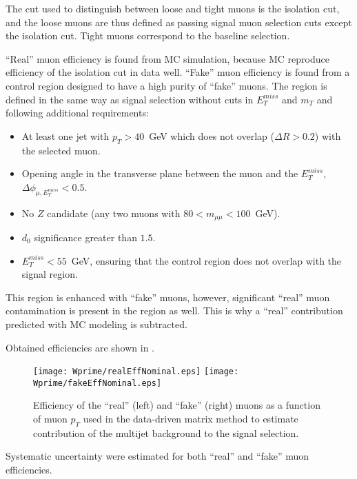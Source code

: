 The cut used to distinguish between loose and tight muons is the isolation cut, and the loose muons
are thus defined as passing signal muon selection cuts except the isolation cut. Tight muons correspond
to the baseline selection.

``Real'' muon efficiency is found from MC simulation, because MC reproduce efficiency of the isolation cut in data well. ``Fake'' muon efficiency is found from a control region designed to have a high purity of ``fake'' muons. The region is defined in the same way as signal selection without cuts in $E_T^{miss}$ and $m_T$ and following additional requirements:
\begin{itemize}
\item At least one jet with $p_T > 40$~GeV which does not overlap ($\Delta R > 0.2$)
with the selected muon.
\item Opening angle in the transverse plane between the muon and the $E_T^{miss}$, $\Delta\phi_{\mu,E_T^{miss}} < 0.5$.
\item No $Z$ candidate (any two muons with $80 < m_{\mu\mu} < 100$~GeV).
\item $d_0$ significance greater than $1.5$.
\item $E_T^{miss} < 55$~GeV, ensuring that the control region does not overlap with the signal region.
\end{itemize}
This region is enhanced with ``fake'' muons, however, significant ``real'' muon contamination is present in the region as well. This is why a ``real'' contribution predicted with MC modeling is subtracted.

Obtained efficiencies are shown in .
\begin{figure}[]
  \centering
  \texttt{[image: Wprime/realEffNominal.eps]}
  \texttt{[image: Wprime/fakeEffNominal.eps]}
  \caption{Efficiency of the ``real'' (left) and ``fake'' (right) muons as a function of muon $p_T$ used in the data-driven matrix method to estimate contribution of the multijet background to the signal selection.}
  \label{fig:matrix_method_efficiencies}
\end{figure}

Systematic uncertainty were estimated for both ``real'' and ``fake'' muon efficiencies.


